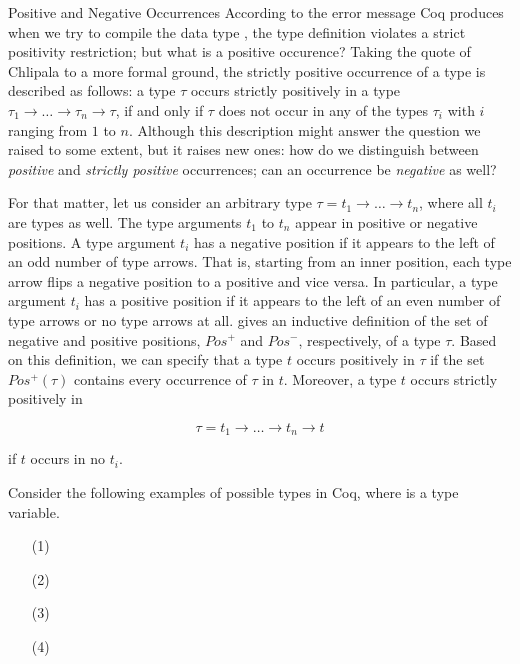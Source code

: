\begin{excursus}{Positive and Negative Occurrences}
According to the error message Coq produces when we try to compile the data type , the type definition violates a strict positivity restriction; but what is a positive occurence?
Taking the quote of Chlipala to a more formal ground, the strictly positive occurrence of a type is described as follows: a type $\tau$ occurs strictly positively in a type $\tau_1\rightarrow \dots \rightarrow \tau_n \rightarrow \tau$, if and only if $\tau$ does not occur in any of the types $\tau_i$ with $i$ ranging from $1$ to $n$.
Although this description might answer the question we raised to some extent, but it raises new ones: how do we distinguish between \emph{positive} and \emph{strictly positive} occurrences; can an occurrence be \emph{negative} as well?

For that matter, let us consider an arbitrary type $\tau = t_1 \rightarrow \dots \rightarrow t_n$, where all $t_i$ are types as well.
The type arguments $t_1$ to $t_n$ appear in positive or negative positions.
A type argument $t_i$ has a negative position if it appears to the left of an odd number of type arrows.
That is, starting from an inner position, each type arrow flips a negative position to a positive and vice versa.
In particular, a type argument $t_i$ has a positive position if it appears to the left of an even number of type arrows or no type arrows at all.
\citet{blanqui2002inductivedatatype} gives an inductive definition of the set of negative and positive positions, $Pos^{+}$ and $Pos^{-}$, respectively, of a type $\tau$.
Based on this definition, we can specify that a type $t$ occurs positively in $\tau$ if the set $Pos^{+} (\tau)$ contains every occurrence of $\tau$ in $t$.
Moreover, a type $t$ occurs strictly positively in

\[
\tau = t_1 \rightarrow \dots \rightarrow t_n \rightarrow t
\]

if $t$ occurs in no $t_i$.

Consider the following examples of possible types in Coq, where  is a type variable.

\begin{enumerate}
\item[(1)] 
\item[(2)] 
\item[(3)] 
\item[(4)] 
\end{enumerate}


\end{excursus}
